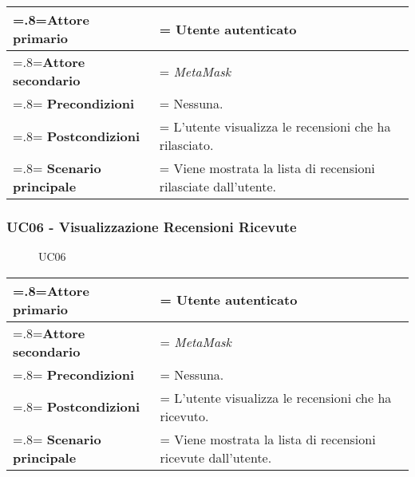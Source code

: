             \begin{center}
                \renewcommand{\arraystretch}{1.5}
                \renewcommand\tabularxcolumn[1]{m{#1}}
                \begin{tabularx}{0.9\textwidth} {
                    >{\hsize=.8\hsize\linewidth=\hsize}X
                    >{\hsize=1.2\hsize\linewidth=\hsize}X}
                    \hline
                    \textbf{Attore primario} & Utente autenticato \\
                    \hline
                    \textbf{Attore secondario} & \textit{MetaMask} \\
                    \hline
                    \textbf{Precondizioni} & Nessuna. \\
                    \hline
                    \textbf{Postcondizioni} & L'utente visualizza le recensioni che ha rilasciato. \\
                    \hline
                    \textbf{Scenario principale} & Viene mostrata la lista di recensioni rilasciate dall'utente. \\
                    \hline
                \end{tabularx}
            \end{center}

        \subsubsection{UC06 - Visualizzazione Recensioni Ricevute}
        \label{UC06}

            \begin{figure}[H]
                \centering
                
                \caption{UC06}
            \end{figure}

            \begin{center}
                \renewcommand{\arraystretch}{1.5}
                \renewcommand\tabularxcolumn[1]{m{#1}}
                \begin{tabularx}{0.9\textwidth} {
                    >{\hsize=.8\hsize\linewidth=\hsize}X
                    >{\hsize=1.2\hsize\linewidth=\hsize}X}
                    \hline
                    \textbf{Attore primario} & Utente autenticato \\
                    \hline
                    \textbf{Attore secondario} & \textit{MetaMask} \\
                    \hline
                    \textbf{Precondizioni} & Nessuna. \\
                    \hline
                    \textbf{Postcondizioni} & L'utente visualizza le recensioni che ha ricevuto. \\
                    \hline
                    \textbf{Scenario principale} & Viene mostrata la lista di recensioni ricevute dall'utente. \\
                    \hline
                \end{tabularx}
            \end{center}

